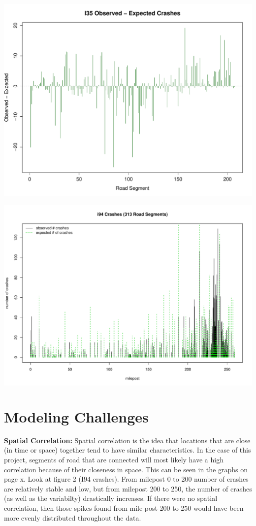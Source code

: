 \centerline{\includegraphics[width=.9\textwidth]{i35crash.pdf}}
\centerline{\includegraphics[width=.9\textwidth]{i94crash.pdf}}


\section{Modeling Challenges}

\textbf{Spatial Correlation:} Spatial correlation is the idea that locations that are close (in time or space) together tend to have similar characteristics. In the case of this project, segments of road that are connected will most likely have a high correlation because of their closeness in space. This can be seen in the graphs on page x. Look at figure 2 (I94 crashes). From milepost 0 to 200 number of crashes are relatively stable and low, but from milepost 200 to 250, the number of crashes (as well as the variabilty) drastically increases. If there were no spatial correlation, then those spikes found from mile post 200 to 250 would have been more evenly distributed throughout the data.

